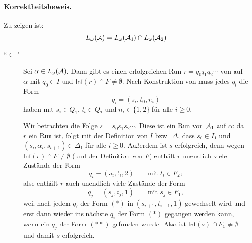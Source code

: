 \documentclass[fontsize=11pt, twoside=false, numbers=autoenddot]{scrbook}
\begin{document}
\paragraph*{Korrektheitsbeweis.}
Zu zeigen ist:
\[
  L_\omega(\mathcal{A}) = L_\omega(\mathcal{A}_1) \cap L_\omega(\mathcal{A}_2)
\]
  \begin{description}
    \item[{\boldmath"`$\subseteq$"'}]
      Sei $\alpha \in L_\omega(\mathcal{A})$.
      Dann gibt es einen erfolgreichen Run $r = q_0q_1q_2\cdots$ von \Amc auf $\alpha$
      mit $q_0 \in I$ und $\textsf{Inf}(r) \cap F \neq \emptyset$.
      Nach Konstruktion von \Amc muss jedes $q_i$ die Form
      \[
        q_i = (s_i,t_0,n_i)
      \]
      haben mit $s_i \in Q_1$, $t_i \in Q_2$ und $n_i \in \{1,2\}$ für alle $i \geq 0$.
      
      Wir betrachten die Folge $s = s_0s_1s_2\cdots$.
      Diese ist ein Run von $\mathcal{A}_1$ auf $\alpha$:
      da $r$ ein Run ist, folgt mit der Definition von $I$ bzw.\ $\Delta$, dass
      $s_0 \in I_1$ und $(s_i,\alpha_i,s_{i+1}) \in \Delta_1$ für alle $i \geq 0$.
      Außerdem ist $s$ erfolgreich, denn wegen $\textsf{Inf}(r) \cap F \neq \emptyset$
      (und der Definition von $F$)
      enthält $r$ unendlich viele Zustände der Form
      \[
        \tag{$*$}
        q_i = (s_i,t_i,2) \qquad \text{mit~} t_i \in F_2;
      \]
      also enthält $r$ auch unendlich viele Zustände der Form
      \[
        \tag{$**$}
        q_j = (s_j,t_j,1) \qquad \text{mit~} s_j \in F_1,
      \]
      weil nach jedem $q_i$ der Form $(*)$ in $(s_{i+1},t_{i+1},1)$ gewechselt wird
      und erst dann wieder ins nächste $q_i$ der Form $(*)$ gegangen werden kann,
      wenn ein $q_j$ der Form $(**)$ gefunden wurde.
      Also ist $\textsf{Inf}(s) \cap F_1 \neq \emptyset$ und damit $s$ erfolgreich.
      

\end{description}
\end{document}
